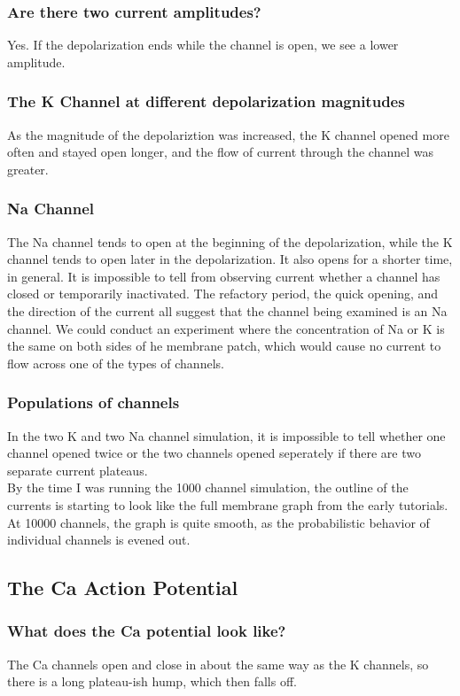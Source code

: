 \documentclass[11pt]{article}
\begin{document}
\subsubsection{Are there two current amplitudes?}
Yes.  If the depolarization ends while the channel is open, we see a lower amplitude.

\subsubsection{The K Channel at different depolarization magnitudes}
As the magnitude of the depolariztion was increased, the K channel opened 
more often and stayed open longer, and the flow of current through the
channel was greater.  

\subsubsection{Na Channel}
The Na channel tends to open at the beginning of the depolarization, while
the K channel tends to open later in the depolarization.
It also opens for a shorter time, in general.
It is impossible to tell from observing current whether a channel
has closed or temporarily inactivated.
The refactory period, the quick opening, and the direction of the current
all suggest that the channel being examined is an Na channel.
We could conduct an experiment where the concentration of Na or K is 
the same on both sides of he membrane patch, which would cause no current to
flow across one of the types of channels.

\subsubsection{Populations of channels}
In the two K and two Na channel simulation, it is impossible to tell whether
one channel opened twice or the two channels opened seperately if there are
two separate current plateaus.\\
By the time I was running the 1000 channel simulation, the outline of the currents is
starting to look like the full membrane graph from the early tutorials.  At 10000 channels,
the graph is quite smooth, as the probabilistic behavior of individual channels is evened out.

\subsection{The Ca Action Potential}
\subsubsection{What does the Ca potential look like?}
The Ca channels open and close in about the same way as the K channels,
so there is a long plateau-ish hump, which then falls off.
\end{document}
